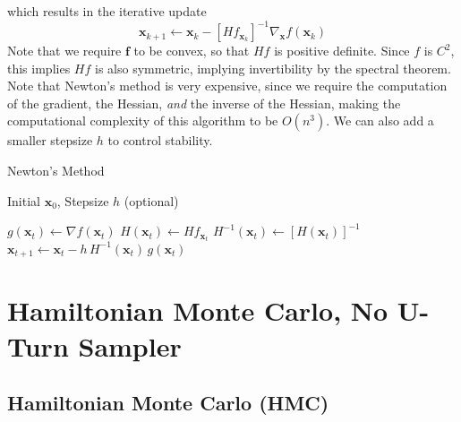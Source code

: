 \documentclass{article}
\begin{document}
    which results in the iterative update 
    \begin{equation}
      \mathbf{x}_{k+1} \gets \mathbf{x}_k - [H f_{\mathbf{x}_k}]^{-1} \nabla_\mathbf{x} f (\mathbf{x}_k)
    \end{equation}
    Note that we require $\mathbf{f}$ to be convex, so that $H f$ is positive definite. Since $f$ is $C^2$, this implies $H f$ is also symmetric, implying invertibility by the spectral theorem. Note that Newton's method is very expensive, since we require the computation of the gradient, the Hessian, \textit{and} the inverse of the Hessian, making the computational complexity of this algorithm to be $O(n^3)$. We can also add a smaller stepsize $h$ to control stability. 

    \begin{algorithm}
      \caption{Newton's Method}\label{alg:netwons}
      \begin{algorithmic}

      \Require Initial $\mathbf{x}_0$, Stepsize $h$ (optional)

          \State $g(\mathbf{x}_t) \gets \nabla f(\mathbf{x}_t)$  
          \State $H(\mathbf{x}_t) \gets H f_{\mathbf{x}_t}$ 
          \State $H^{-1} (\mathbf{x}_t) \gets [H(\mathbf{x}_t)]^{-1}$ 
          \State $\mathbf{x}_{t+1} \gets \mathbf{x}_t - h \, H^{-1} (\mathbf{x}_t) \, g(\mathbf{x}_t)$
      \EndFor

      \end{algorithmic}
    \end{algorithm}

\section{Hamiltonian Monte Carlo, No U-Turn Sampler}

  \subsection{Hamiltonian Monte Carlo (HMC)}
\end{document}
